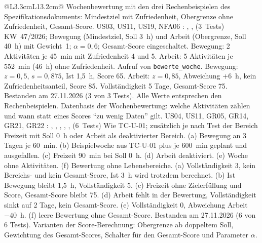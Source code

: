 \begingroup
\begin{longtable}{@{}L{3.3cm}L{13.2cm}@{}}
    {Wochenbewertung mit den drei Rechenbeispielen des Spezifikationsdokuments: Mindestziel mit Zufriedenheit, Obergrenze ohne Zufriedenheit, Gesamt-Score.}
    {US03, US11, US19, NFA06}
    {: , ,  (3~Tests)}
    {KW~47/2026; Bewegung (Mindestziel, Soll 3~h) und Arbeit (Obergrenze, Soll 40~h) mit Gewicht~1; $\alpha = 0{,}6$; Gesamt-Score eingeschaltet.}
    {Bewegung: 2 Aktivitäten je 45~min mit Zufriedenheit 4 und 5. Arbeit: 5 Aktivitäten je 552~min (46~h) ohne Zufriedenheit. Aufruf von \texttt{bewerte\_woche}.}
    {Bewegung: $z = 0{,}5$, $s = 0{,}875$, Ist 1,5~h, Score 65. Arbeit: $z = 0{,}85$, Abweichung $+6$~h, kein Zufriedenheitsanteil, Score 85. Vollständigkeit 5 Tage, Gesamt-Score 75.}
    {Bestanden am 27.11.2026 (3 von 3 Tests). Alle Werte entsprechen den Rechenbeispielen.}
  \midrule
    {Datenbasis der Wochenbewertung: welche Aktivitäten zählen und wann statt eines Scores \enquote{zu wenig Daten} gilt.}
    {US04, US11, GR05, GR14, GR21, GR22}
    {: , , , , ,  (6~Tests)}
    {Wie TC-U-01; zusätzlich je nach Test der Bereich Freizeit mit Soll 0~h oder Arbeit als deaktivierter Bereich.}
    {(a) Bewegung an 3 Tagen je 60~min. (b) Beispielwoche aus TC-U-01 plus je 600~min geplant und ausgefallen. (c) Freizeit 90~min bei Soll 0~h. (d) Arbeit deaktiviert. (e) Woche ohne Aktivitäten. (f) Bewertung ohne Lebensbereiche.}
    {(a) Vollständigkeit 3, kein Bereichs- und kein Gesamt-Score, Ist 3~h wird trotzdem berechnet. (b) Ist Bewegung bleibt 1,5~h, Vollständigkeit 5. (c) Freizeit ohne Zielerfüllung und Score, Gesamt-Score bleibt 75. (d) Arbeit fehlt in der Bewertung, Vollständigkeit sinkt auf 2 Tage, kein Gesamt-Score. (e) Vollständigkeit 0, Abweichung Arbeit $-40$~h. (f) leere Bewertung ohne Gesamt-Score.}
    {Bestanden am 27.11.2026 (6 von 6 Tests).}
  \midrule
    {Varianten der Score-Berechnung: Obergrenze ab doppeltem Soll, Gewichtung des Gesamt-Scores, Schalter für den Gesamt-Score und Parameter $\alpha$.}

\end{longtable}
